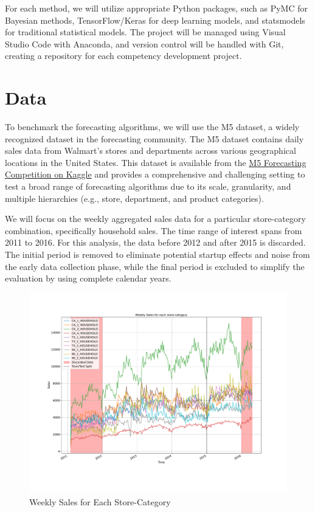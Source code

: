 For each method, we will utilize appropriate Python packages, such as PyMC for Bayesian methods, TensorFlow/Keras for deep learning models, and statsmodels for traditional statistical models. The project will be managed using Visual Studio Code with Anaconda, and version control will be handled with Git, creating a repository for each competency development project.


\section{Data}
To benchmark the forecasting algorithms, we will use the M5 dataset, a widely recognized dataset in the forecasting community. The M5 dataset contains daily sales data from Walmart's stores and departments across various geographical locations in the United States. This dataset is available from the \href{https://www.kaggle.com/competitions/m5-forecasting-accuracy/}{M5 Forecasting Competition on Kaggle} and provides a comprehensive and challenging setting to test a broad range of forecasting algorithms due to its scale, granularity, and multiple hierarchies (e.g., store, department, and product categories).



We will focus on the weekly aggregated sales data for a particular store-category combination, specifically household sales. The time range of interest spans from 2011 to 2016. For this analysis, the data before 2012 and after 2015 is discarded. The initial period is removed to eliminate potential startup effects and noise from the early data collection phase, while the final period is excluded to simplify the evaluation by using complete calendar years. 

\begin{figure}[h]
	\centering
	\includegraphics[width=1\textwidth]{./figures/raw_data.pdf}
	\caption{Weekly Sales for Each Store-Category}
	\label{fig:weekly_sales}
\end{figure}

